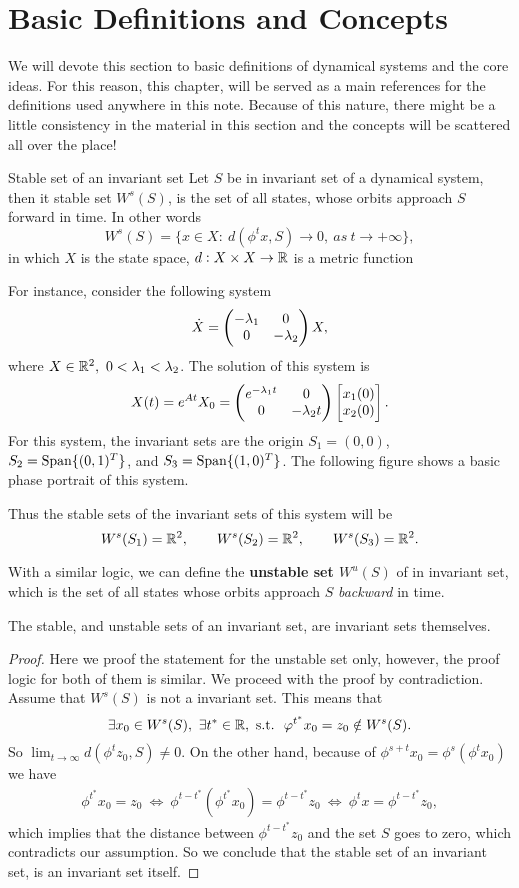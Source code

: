 \section{Basic Definitions and Concepts}

We will devote this section to basic definitions of dynamical systems and the core ideas. For this reason, this chapter, will be served as a main references for the definitions used anywhere in this note. Because of this nature, there might be a little consistency in the material in this section and the concepts will be scattered all over the place!


\begin{defbox}{Stable set of an invariant set}
	Let $S$ be in invariant set of a dynamical system, then it stable set $W^s(S)$, is the set of all states, whose orbits approach $S$ forward in time. In other words
	\[ W^s(S) = \{ x\in X:\ d(\phi^t x, S) \to 0,\ as\ t\to+\infty \}, \]
	in which $X$ is the state space, $d:X\times X\to \mathbb{R}$ is a metric function
\end{defbox}

For instance, consider the following system
\[ \dot{X} = \begin{pmatrix} -\lambda_1 & 0 \\ 0 & -\lambda_2 \end{pmatrix} X, \]
where $X\in\R^2,\ 0<\lambda_1<\lambda_2$. The solution of this system is 
\[ X(t) = e^{At}X_0 = \begin{pmatrix} e^{-\lambda_1t} & 0 \\ 0 & -\lambda_2t \end{pmatrix}\begin{bmatrix} x_1(0) \\ x_2(0) \end{bmatrix}. \]
For this system, the invariant sets are the origin $S_1 = {(0,0)}$, $S_2=\operatorname{Span}\{(0,1)^T\}$, and $S_3=\operatorname{Span}\{(1,0)^T\}$. The following figure shows a basic phase portrait of this system.


Thus the stable sets of the invariant sets of this system will be
\[ W^s(S_1)=\mathbb{R}^2,\qquad W^s(S_2)=\mathbb{R}^2, \qquad W^s(S_3)=\mathbb{R}^2. \]

With a similar logic, we can define the \textbf{unstable set $ W^u(S)$} of in invariant set, which is the set of all states whose orbits approach $S$ \emph{backward} in time.

\begin{corbox}
	The stable, and unstable sets of an invariant set, are invariant sets themselves.
\end{corbox}
\begin{proof}
	Here we proof the statement for the unstable set only, however, the proof logic for both of them is similar. We proceed with the proof by contradiction. Assume that $W^s(S)$ is not a invariant set. This means that 
	\[ \exists x_0\in W^s(S),\ \exists t^*\in\R, \st\ \phi^{t^*} x_0 = z_0  \notin W^s(S).  \]
	So $\lim_{t\to\infty} d(\phi^t z_0, S) \neq 0$. On the other hand, because of  $\phi^{s+t}x_0 = \phi^s (\phi^t x_0)$ we have
	\begin{align*}
		\phi^{t^*}x_0 = z_0 \ \Leftrightarrow\ \phi^{t-t^*}(\phi^{t^*}x_0)= \phi^{t-t^*} z_0\ \Leftrightarrow\ \phi^t x = \phi^{t-t^*} z_0,
	\end{align*}
	which implies that the distance between $\phi^{t-t^*}z_0$ and the set $S$ goes to zero, which contradicts our assumption. So we conclude that the stable set of an invariant set, is an invariant set itself.

\end{proof}


